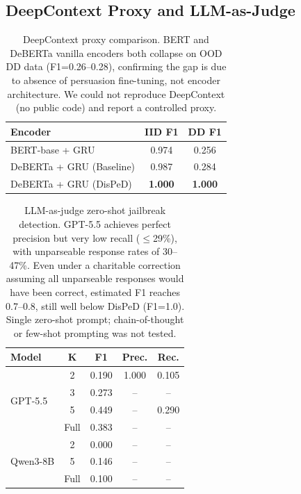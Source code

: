 \documentclass[11pt,a4paper]{article}
\newcommand{\ours}{DisPeD}
\newcommand{\bfres}[1]{\textbf{#1}}
\begin{document}
\subsection{DeepContext Proxy and LLM-as-Judge}

\begin{table}[t]
\centering
\small
\begin{tabular}{lcc}
\toprule
\textbf{Encoder} & \textbf{IID F1} & \textbf{DD F1} \\
\midrule
BERT-base + GRU & 0.974 & 0.256 \\
DeBERTa + GRU (Baseline) & 0.987 & 0.284 \\
DeBERTa + GRU (\ours{}) & \bfres{1.000} & \bfres{1.000} \\
\bottomrule
\end{tabular}
\caption{DeepContext proxy comparison. BERT and DeBERTa vanilla encoders both collapse on OOD DD data (F1=0.26--0.28), confirming the gap is due to absence of persuasion fine-tuning, not encoder architecture. We could not reproduce DeepContext (no public code) and report a controlled proxy.}
\label{tab:deepcontext}
\end{table}

\begin{table}[t]
\centering
\small
\begin{tabular}{lcccc}
\toprule
\textbf{Model} & \textbf{K} & \textbf{F1} & \textbf{Prec.} & \textbf{Rec.} \\
\midrule
\multirow{4}{*}{GPT-5.5} & 2 & 0.190 & 1.000 & 0.105 \\
 & 3 & 0.273 & -- & -- \\
 & 5 & 0.449 & -- & 0.290 \\
 & Full & 0.383 & -- & -- \\
\midrule
\multirow{3}{*}{Qwen3-8B} & 2 & 0.000 & -- & -- \\
 & 5 & 0.146 & -- & -- \\
 & Full & 0.100 & -- & -- \\
\bottomrule
\end{tabular}
\caption{LLM-as-judge zero-shot jailbreak detection. GPT-5.5 achieves perfect precision but very low recall ($\leq$29\%), with unparseable response rates of 30--47\%. Even under a charitable correction assuming all unparseable responses would have been correct, estimated F1 reaches 0.7--0.8, still well below \ours{} (F1=1.0). Single zero-shot prompt; chain-of-thought or few-shot prompting was not tested.}
\label{tab:llm_judge}
\end{table}
\end{document}
